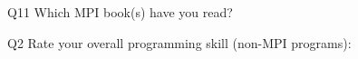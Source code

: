 \begin{description}%
\item{Q11} Which MPI book(s) have you read?%
\item{Q2} Rate your overall programming skill (non-MPI programs):%
\end{description}%
